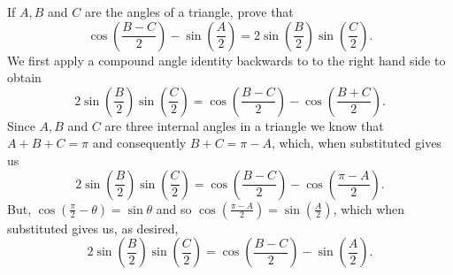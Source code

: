 If $A, B$ and $C$ are the angles of a triangle, prove that
\[
\cos \left(\frac{B-C}{2} \right)-\sin\left(\frac{A}{2}\right) = 2 \sin\left(\frac{B}{2}\right)\sin\left(\frac{C}{2}\right).
\]
\newline
We first apply a compound angle identity backwards to to the right hand side to obtain
\[
2\sin\left(\frac{B}{2}\right)\sin\left(\frac{C}{2}\right) = \cos\left(\frac{B-C}{2}\right) - \cos\left(\frac{B+C}{2}\right).
\]
Since $A,B$ and $C$ are three internal angles in a triangle we know that $A+B+C = \pi$ and consequently $B+C = \pi - A$, which, when substituted gives us
\[
2\sin\left(\frac{B}{2}\right)\sin\left(\frac{C}{2}\right) = \cos\left(\frac{B-C}{2}\right) - \cos\left(\frac{\pi-A}{2}\right).
\]
But, $\cos\left(\frac{\pi}{2}-\theta\right) = \sin \theta$ and so $\cos\left(\frac{\pi-A}{2}\right) = \sin\left(\frac{A}{2}\right)$, which when substituted gives us, as desired,
\[
2\sin\left(\frac{B}{2}\right)\sin\left(\frac{C}{2}\right) = \cos \left(\frac{B-C}{2} \right)-\sin\left(\frac{A}{2}\right).
\]